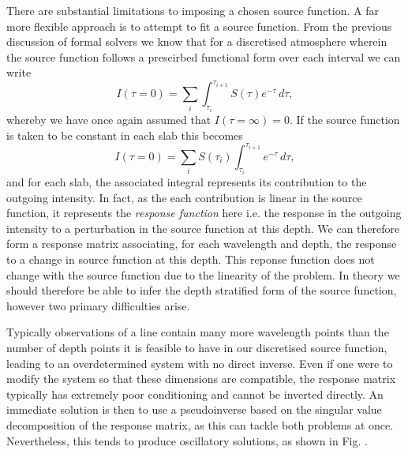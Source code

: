 There are substantial limitations to imposing a chosen source function.
A far more flexible approach is to attempt to fit a source function.
From the previous discussion of formal solvers we know that for a discretised atmosphere wherein the source function follows a prescirbed functional form over each interval we can write
\begin{equation}
    I(\tau=0) = \sum_i \int_{\tau_i}^{\tau_{i+1}} S(\tau)e^{-\tau}\, d\tau,
\end{equation}
whereby we have once again assumed that $I(\tau=\infty)=0$.
If the source function is taken to be constant in each slab this becomes
\begin{equation}
    I(\tau=0) = \sum_i S(\tau_i) \int_{\tau_i}^{\tau_{i+1}} e^{-\tau}\, d\tau,
\end{equation}
and for each slab, the associated integral represents its contribution to the outgoing intensity. In fact, as the each contribution is linear in the source function, it represents the \emph{response function} here i.e. the response in the outgoing intensity to a perturbation in the source function at this depth.
We can therefore form a response matrix associating, for each wavelength and depth, the response to a change in source function at this depth.
This reponse function does not change with the source function due to the linearity of the problem.
In theory we should therefore be able to infer the depth stratified form of the source function, however two primary difficulties arise.

Typically observations of a line contain many more wavelength points than the number of depth points it is feasible to have in our discretised source function, leading to an overdetermined system with no direct inverse.
Even if one were to modify the system so that these dimensions are compatible, the response matrix typically has extremely poor conditioning and cannot be inverted directly.
An immediate solution is then to use a pseudoinverse based on the singular value decomposition of the response matrix, as this can tackle both problems at once.
Nevertheless, this tends to produce oscillatory solutions, as shown in Fig. \NeedRef{}.

